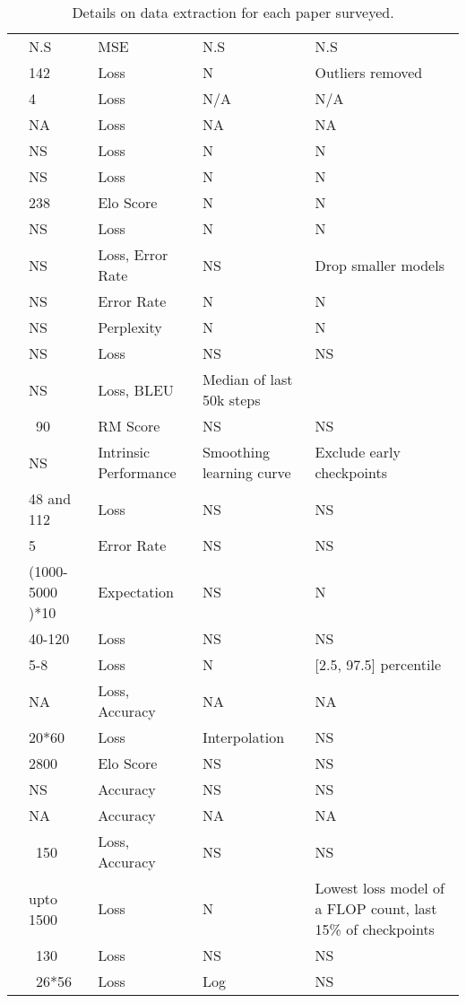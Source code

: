 \begin{table}[]
{\begin{tabular}{lllll}
\cite{gao2024scalingevaluatingsparseautoencoders} & N.S & MSE & N.S & N.S \\
\cite{muennighoff2024scaling} & 142 & Loss & N & Outliers removed \\
\cite{rae2021scaling} & 4 & Loss & N/A & N/A \\
\cite{shin2023scaling} & NA & Loss & NA & NA \\
\cite{hernandez2022scaling} & NS & Loss & N & N \\
\cite{filipovich2022scaling} & NS & Loss & N & N \\
\cite{neumann2022scaling} & 238 & Elo Score & N & N \\
\cite{droppo2021scaling} & NS & Loss & N & N \\
\cite{henighan2020scaling} & NS & Loss, Error Rate & NS & Drop smaller models \\
\cite{goyal2024scaling} & NS & Error Rate & N & N \\
\cite{aghajanyan2023scaling} & NS & Perplexity & N & N \\
\cite{kaplan2020scaling} & NS & Loss & NS & NS \\
\cite{ghorbani2021scaling} & NS & Loss, BLEU & Median of last 50k steps &  \\
\cite{gao2023scaling} & ~90 & RM Score & NS & NS \\
\cite{hilton2023scaling} & NS & Intrinsic Performance & Smoothing learning curve & Exclude early checkpoints \\
\cite{frantar2023scaling} & 48 and 112 & Loss & NS & NS \\
\cite{prato2021scaling} & 5 & Error Rate & NS & NS \\
\cite{covert2024scaling} & (1000-5000 )*10 & Expectation  & NS & N \\
\cite{hernandez2021scaling} & 40-120 & Loss & NS & NS \\
\cite{ivgi2022scaling} & 5-8 & Loss & N & [2.5, 97.5] percentile \\
\cite{tay2022scaling} & NA & Loss, Accuracy & NA & NA \\
\cite{tao2024scaling} & 20*60 & Loss & Interpolation & NS \\
\cite{jones2021scaling} & 2800 & Elo Score & NS & NS \\
\cite{zhai2022scaling} & NS & Accuracy & NS & NS \\
\cite{dettmers2023case} & NA & Accuracy & NA & NA \\
\cite{dubey2024llama} & ~150 & Loss, Accuracy & NS & NS \\
\cite{hoffmann2022training} & upto 1500 & Loss & N & Lowest loss model of a FLOP count, last 15\% of checkpoints \\
\cite{ardalani2022understanding} & ~130 & Loss & NS & NS \\
\cite{clark2022unified} & ~26*56 & Loss & Log & NS \\
\bottomrule
\end{tabular}

}

\caption{Details on data extraction for each paper surveyed.}
\label{tab:full-eval}
\end{table}





